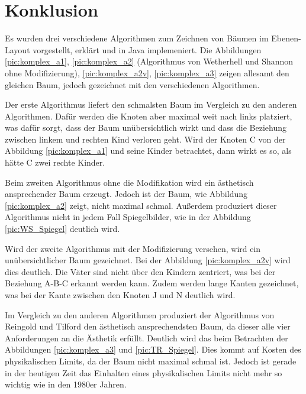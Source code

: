 \chapter{Konklusion}
\label{chap:kapitel4}
Es wurden drei verschiedene Algorithmen zum Zeichnen von Bäumen im Ebenen-Layout vorgestellt, erklärt und in Java implemeniert.
Die Abbildungen \ref{pic:komplex_a1}, \ref{pic:komplex_a2} (Algorithmus von Wetherhell und Shannon ohne Modifizierung), 
\ref{pic:komplex_a2v}, \ref{pic:komplex_a3} zeigen allesamt den gleichen Baum, jedoch gezeichnet mit den verschiedenen Algorithmen. 

Der erste Algorithmus liefert den schmalsten Baum im Vergleich zu den anderen Algorithmen. Dafür werden die Knoten aber maximal weit nach links
platziert, was dafür sorgt, dass der Baum unübersichtlich wirkt und dass die Beziehung zwischen linkem und rechten Kind verloren geht. Wird der
Knoten C von der Abbildung \ref{pic:komplex_a1} und seine Kinder betrachtet, dann wirkt es so, als hätte C zwei rechte Kinder.

Beim zweiten Algorithmus ohne die Modifikation wird ein ästhetisch ansprechender Baum erzeugt. Jedoch ist der Baum, wie Abbildung
\ref{pic:komplex_a2} zeigt, nicht maximal schmal. Außerdem produziert dieser Algorithmus nicht in jedem Fall Spiegelbilder, wie in der
Abbildung \ref{pic:WS_Spiegel} deutlich wird. 

Wird der zweite Algorithmus mit der Modifizierung versehen, wird ein unübersichtlicher Baum gezeichnet. Bei der Abbildung \ref{pic:komplex_a2v}
wird dies deutlich. Die Väter sind nicht über den Kindern zentriert, was bei der Beziehung A-B-C erkannt werden kann. Zudem werden lange Kanten
gezeichnet, was bei der Kante zwischen den Knoten J und N deutlich wird.

Im Vergleich zu den anderen Algorithmen produziert der Algorithmus von Reingold und Tilford den ästhetisch ansprechendsten Baum, da dieser
alle vier Anforderungen an die Ästhetik erfüllt. Deutlich wird das beim Betrachten der Abbildungen \ref{pic:komplex_a3} und \ref{pic:TR_Spiegel}.
Dies kommt auf Kosten des physikalischen Limits, da der Baum nicht maximal schmal ist. Jedoch ist gerade in der heutigen Zeit das Einhalten
eines physikalischen Limits nicht mehr so wichtig wie in den 1980er Jahren. 

